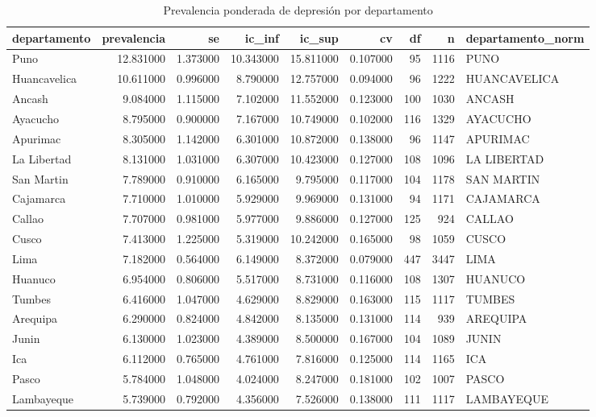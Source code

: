 \begin{table}[htbp]
\caption{Prevalencia ponderada de depresión por departamento}
\label{tab:tabla_09_prevalencia_departamento}
\begin{tabular}{lrrrrrrrl}
\toprule
departamento & prevalencia & se & ic\_inf & ic\_sup & cv & df & n & departamento\_norm \\
\midrule
Puno & 12.831000 & 1.373000 & 10.343000 & 15.811000 & 0.107000 & 95 & 1116 & PUNO \\
Huancavelica & 10.611000 & 0.996000 & 8.790000 & 12.757000 & 0.094000 & 96 & 1222 & HUANCAVELICA \\
Ancash & 9.084000 & 1.115000 & 7.102000 & 11.552000 & 0.123000 & 100 & 1030 & ANCASH \\
Ayacucho & 8.795000 & 0.900000 & 7.167000 & 10.749000 & 0.102000 & 116 & 1329 & AYACUCHO \\
Apurimac & 8.305000 & 1.142000 & 6.301000 & 10.872000 & 0.138000 & 96 & 1147 & APURIMAC \\
La Libertad & 8.131000 & 1.031000 & 6.307000 & 10.423000 & 0.127000 & 108 & 1096 & LA LIBERTAD \\
San Martin & 7.789000 & 0.910000 & 6.165000 & 9.795000 & 0.117000 & 104 & 1178 & SAN MARTIN \\
Cajamarca & 7.710000 & 1.010000 & 5.929000 & 9.969000 & 0.131000 & 94 & 1171 & CAJAMARCA \\
Callao & 7.707000 & 0.981000 & 5.977000 & 9.886000 & 0.127000 & 125 & 924 & CALLAO \\
Cusco & 7.413000 & 1.225000 & 5.319000 & 10.242000 & 0.165000 & 98 & 1059 & CUSCO \\
Lima & 7.182000 & 0.564000 & 6.149000 & 8.372000 & 0.079000 & 447 & 3447 & LIMA \\
Huanuco & 6.954000 & 0.806000 & 5.517000 & 8.731000 & 0.116000 & 108 & 1307 & HUANUCO \\
Tumbes & 6.416000 & 1.047000 & 4.629000 & 8.829000 & 0.163000 & 115 & 1117 & TUMBES \\
Arequipa & 6.290000 & 0.824000 & 4.842000 & 8.135000 & 0.131000 & 114 & 939 & AREQUIPA \\
Junin & 6.130000 & 1.023000 & 4.389000 & 8.500000 & 0.167000 & 104 & 1089 & JUNIN \\
Ica & 6.112000 & 0.765000 & 4.761000 & 7.816000 & 0.125000 & 114 & 1165 & ICA \\
Pasco & 5.784000 & 1.048000 & 4.024000 & 8.247000 & 0.181000 & 102 & 1007 & PASCO \\
Lambayeque & 5.739000 & 0.792000 & 4.356000 & 7.526000 & 0.138000 & 111 & 1117 & LAMBAYEQUE \\

\end{tabular}
\end{table}
